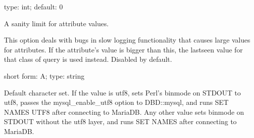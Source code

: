 \documentclass[letterpaper,10pt,english]{sphinxmanual}
\begin{document}

\begin{fulllineitems}
\label{\detokenize{mariadb-query-digest:cmdoption-mariadb-query-digest-attribute-value-limit}}
\sphinxAtStartPar
type: int; default: 0

\sphinxAtStartPar
A sanity limit for attribute values.

\sphinxAtStartPar
This option deals with bugs in slow logging functionality that causes large
values for attributes.  If the attribute’s value is bigger than this, the
last\sphinxhyphen{}seen value for that class of query is used instead.
Disabled by default.

\end{fulllineitems}


\begin{fulllineitems}
\label{\detokenize{mariadb-query-digest:cmdoption-mariadb-query-digest-charset}}
\sphinxAtStartPar
short form: \sphinxhyphen{}A; type: string

\sphinxAtStartPar
Default character set.  If the value is utf8, sets Perl’s binmode on
STDOUT to utf8, passes the mysql\_enable\_utf8 option to DBD::mysql, and
runs SET NAMES UTF8 after connecting to MariaDB.  Any other value sets
binmode on STDOUT without the utf8 layer, and runs SET NAMES after
connecting to MariaDB.

\end{fulllineitems}
\end{document}
